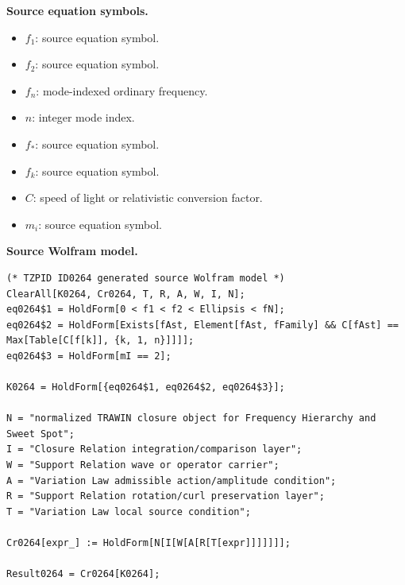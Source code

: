 \begin{minipage}[t]{0.49\linewidth}
\begingroup
\small
\raggedright
\textbf{Source equation symbols.}\par
\begin{itemize}[leftmargin=1.35em,itemsep=1pt,topsep=1pt,parsep=0pt]
    \item $f_{1}$: source equation symbol.
    \item $f_{2}$: source equation symbol.
    \item $f_{n}$: mode-indexed ordinary frequency.
    \item $n$: integer mode index.
    \item $f_{\ast}$: source equation symbol.
    \item $f_{k}$: source equation symbol.
    \item $C$: speed of light or relativistic conversion factor.
    \item $m_i$: source equation symbol.
\end{itemize}
\endgroup
\end{minipage}\hfill
\begin{minipage}[t]{0.47\linewidth}
\begingroup
\scriptsize
\raggedright
\textbf{Source Wolfram model.}\par
\begin{Verbatim}[fontsize=\tiny,breaklines=true,breakanywhere=true]
(* TZPID ID0264 generated source Wolfram model *)
ClearAll[K0264, Cr0264, T, R, A, W, I, N];
eq0264$1 = HoldForm[0 < f1 < f2 < Ellipsis < fN];
eq0264$2 = HoldForm[Exists[fAst, Element[fAst, fFamily] && C[fAst] == Max[Table[C[f[k]], {k, 1, n}]]]];
eq0264$3 = HoldForm[mI == 2];

K0264 = HoldForm[{eq0264$1, eq0264$2, eq0264$3}];

N = "normalized TRAWIN closure object for Frequency Hierarchy and Sweet Spot";
I = "Closure Relation integration/comparison layer";
W = "Support Relation wave or operator carrier";
A = "Variation Law admissible action/amplitude condition";
R = "Support Relation rotation/curl preservation layer";
T = "Variation Law local source condition";

Cr0264[expr_] := HoldForm[N[I[W[A[R[T[expr]]]]]]];

Result0264 = Cr0264[K0264];
\end{Verbatim}
\endgroup
\end{minipage}

